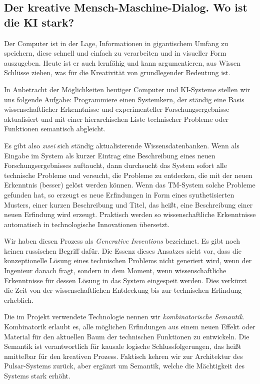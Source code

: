 \documentclass[11pt,a4paper]{article}
\begin{document}
\subsection{Der kreative Mensch-Maschine-Dialog. Wo ist die KI stark?}

Der Computer ist in der Lage, Informationen in gigantischem Umfang zu
speichern, diese schnell und einfach zu verarbeiten und in visueller Form
auszugeben. Heute ist er auch lernfähig und kann argumentieren, aus Wissen
Schlüsse ziehen, was für die Kreativität von grundlegender Bedeutung ist.

In Anbetracht der Möglichkeiten heutiger Computer und KI-Systeme stellen wir
uns folgende Aufgabe: Programmiere einen Systemkern, der ständig eine Basis
wissenschaftlicher Erkenntnisse und experimenteller Forschungsergebnisse
aktualisiert und mit einer hierarchischen Liste technischer Probleme oder
Funktionen semantisch abgleicht.

Es gibt also \emph{zwei} sich ständig aktualisierende Wissensdatenbanken.
Wenn als Eingabe im System als kurzer Eintrag eine Beschreibung eines neuen
Forschungsergebnisses auftaucht, dann durchsucht das System sofort alle
technische Probleme und versucht, die Probleme zu entdecken, die mit der neuen
Erkenntnis (besser) gelöst werden können. Wenn das TM-System solche Probleme
gefunden hat, so erzeugt es neue Erfindungen in Form eines synthetisierten
Musters, einer kurzen Beschreibung und Titel, das heißt, eine Beschreibung
einer neuen Erfindung wird erzeugt. Praktisch werden so wissenschaftliche
Erkenntnisse automatisch in technologische Innovationen übersetzt.

Wir haben diesen Prozess als \emph{Generative Inventions} bezeichnet. Es gibt
noch keinen russischen Begriff dafür. Die Essenz dieses Ansatzes sieht vor,
dass die konzeptionelle Lösung eines technischen Problems nicht generiert
wird, wenn der Ingenieur danach fragt, sondern in dem Moment, wenn
wissenschaftliche Erkenntnisse für dessen Lösung in das System eingespeit
werden. Dies verkürzt die Zeit von der wissenschaftlichen Entdeckung bis zur
technischen Erfindung erheblich.

Die im Projekt verwendete Technologie nennen wir \emph{kombinatorische
  Semantik}.  Kombinatorik erlaubt es, alle möglichen Erfindungen aus einem
neuen Effekt oder Material für den aktuellen Baum der technischen Funktionen
zu entwickeln.  Die Semantik ist verantwortlich für kausale logische
Schlussfolgerungen, das heißt nmittelbar für den kreativen Prozess. Faktisch
kehren wir zur Architektur des Pulsar-Systems zurück, aber ergänzt um
Semantik, welche die Mächtigkeit des Systems stark erhöht.
\end{document}
